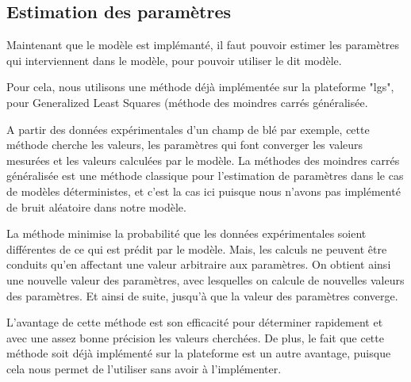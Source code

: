 \subsection{Estimation des paramètres}

Maintenant que le modèle est implémanté, il faut pouvoir estimer les paramètres qui interviennent dans le modèle, pour pouvoir utiliser le dit modèle.

Pour cela, nous utilisons une méthode déjà implémentée sur la plateforme "lgs", pour Generalized Least Squares (méthode des moindres carrés généralisée. 

A partir des données expérimentales d'un champ de blé par exemple, cette méthode cherche les valeurs, les paramètres qui font converger les valeurs mesurées et les valeurs calculées par le modèle. 
La méthodes des moindres carrés généralisée est une méthode classique pour l'estimation de paramètres dans le cas de modèles déterministes, et c'est la cas ici puisque nous n'avons pas implémenté de bruit aléatoire dans notre modèle.

La méthode minimise la probabilité que les données expérimentales soient différentes de ce qui est prédit par le modèle. 
Mais, les calculs ne peuvent être conduits qu'en affectant une valeur arbitraire aux paramètres. On obtient ainsi une nouvelle valeur des paramètres, avec lesquelles on calcule de nouvelles valeurs des paramètres. Et ainsi de suite, jusqu'à que la valeur des paramètres converge.

L'avantage de cette méthode est son efficacité pour déterminer rapidement et avec une assez bonne précision les valeurs cherchées.
De plus, le fait que cette méthode soit déjà implémenté sur la plateforme est un autre avantage, puisque cela nous permet de l'utiliser sans avoir à l'implémenter. 

